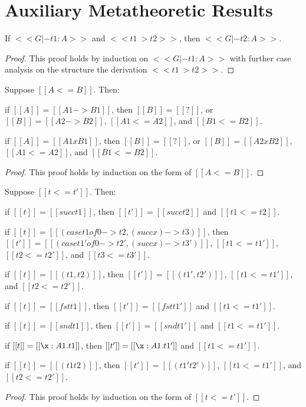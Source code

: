 \section{Auxiliary Metatheoretic Results}
\label{sec:auxiliary_metatheoretic_results}

\begin{lemma}
  \label{lemma:type_preservation}
  If $<<G |- t1 : A>>$ and $<<t1 ~> t2>>$, then $<<G |- t2 : A>>$.
\end{lemma}
\begin{proof}
  This proof holds by induction on $<<G |- t1 : A>>$ with further case
  analysis on the structure the derivation $<<t1 ~> t2>>$.
\end{proof}

\begin{lemma}
  \label{lemma:inversion_of_type_precision}
  Suppose $[[A <= B]]$.  Then:
  \begin{enumR} \small
  \item if $[[A]] = [[A1 -> B1]]$, then
    $[[B]] = [[?]]$, or $[[B]] = [[A2 -> B2]]$, $[[A1 <= A2]]$, and $[[B1 <= B2]]$.
  \item if $[[A]] = [[A1 x B1]]$, then
    $[[B]] = [[?]]$, or $[[B]] = [[A2 x B2]]$, $[[A1 <= A2]]$, and $[[B1 <= B2]]$.  
  \end{enumR}
\end{lemma}
\begin{proof}
  This proof holds by induction on the form of $[[A <= B]]$.
\end{proof}

\begin{lemma}
  \label{lemma:inversion_of_term_precision}
  Suppose $[[t <= t']]$. Then:
  \begin{enumR}\small
  \item if $[[t]] = [[succ t1]]$, then $[[t']] = [[succ t2]]$ and $[[t1 <= t2]]$.
  \item if $[[t]] = [[(case t1 of 0 -> t2, (succ x) -> t3)]]$, then\\
    $[[t']] = [[(case t1' of 0 -> t2', (succ x) -> t3')]]$, $[[t1 <= t1']]$, $[[t2 <= t2']]$, and $[[t3 <= t3']]$.
  \item if $[[t]] = [[(t1,t2)]]$, then $[[t']] = [[(t1',t2')]]$, $[[t1 <= t1']]$, and $[[t2 <= t2']]$.
  \item if $[[t]] = [[fst t1]]$, then $[[t']] = [[fst t1']]$ and $[[t1 <= t1']]$.
  \item if $[[t]] = [[snd t1]]$, then $[[t']] = [[snd t1']]$ and $[[t1 <= t1']]$.
  \item if $[[t]] = [[\x:A1.t1]]$, then $[[t']] = [[\x:A1.t1']]$ and $[[t1 <= t1']]$.
  \item if $[[t]] = [[(t1 t2)]]$, then $[[t']] = [[(t1' t2')]]$, $[[t1 <= t1']]$, and $[[t2 <= t2']]$.
  \end{enumR}
\end{lemma}
\begin{proof}
  This proof holds by induction on the form of $[[t <= t']]$.
\end{proof}

